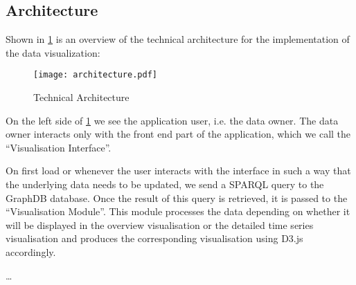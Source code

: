 \documentclass[../paper.tex]{subfiles}
\begin{document}
  \subsection{Architecture}

  Shown in \cref{fig:architecture} is an overview of the technical architecture
  for the implementation of the data visualization:

  \begin{figure}
    \centering
    \texttt{[image: architecture.pdf]}
    \caption{Technical Architecture}
    \label{fig:architecture}
  \end{figure}

  On the left side of \cref{fig:architecture} we see the application user, i.e.
  the data owner. The data owner interacts only with the front end part of the
  application, which we call the “Visualisation Interface”.

  On first load or whenever the user interacts with the interface in such a way
  that the underlying data needs to be updated, we send a SPARQL query to the
  GraphDB database. Once the result of this query is retrieved, it is passed to
  the “Visualisation Module”. This module processes the data depending on
  whether it will be displayed in the overview visualisation or the detailed
  time series visualisation and produces the corresponding visualisation
  using D3.js accordingly.


  …
\end{document}

